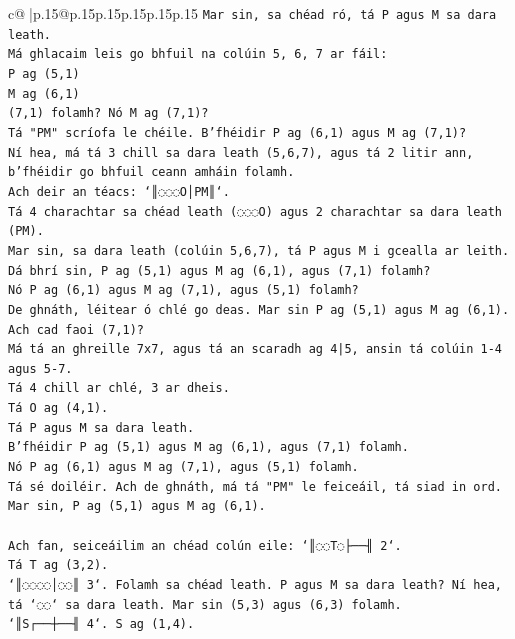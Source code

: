 \documentclass{article}
\begin{document}
{\begin{supertabular}{c@{$\;$}|p{.15\linewidth}@{}p{.15\linewidth}p{.15\linewidth}p{.15\linewidth}p{.15\linewidth}p{.15\linewidth}}
{{{\texttt{Mar sin, sa chéad ró, tá P agus M sa dara leath.} \\
\texttt{Má ghlacaim leis go bhfuil na colúin 5, 6, 7 ar fáil:} \\
\texttt{P ag (5,1)} \\
\texttt{M ag (6,1)} \\
\texttt{(7,1) folamh? Nó M ag (7,1)?} \\
\texttt{Tá "PM" scríofa le chéile. B'fhéidir P ag (6,1) agus M ag (7,1)?} \\
\texttt{Ní hea, má tá 3 chill sa dara leath (5,6,7), agus tá 2 litir ann, b'fhéidir go bhfuil ceann amháin folamh.} \\
\texttt{Ach deir an téacs: `║◌◌◌O│PM║`.} \\
\texttt{Tá 4 charachtar sa chéad leath (◌◌◌O) agus 2 charachtar sa dara leath (PM).} \\
\texttt{Mar sin, sa dara leath (colúin 5,6,7), tá P agus M i gcealla ar leith.} \\
\texttt{Dá bhrí sin, P ag (5,1) agus M ag (6,1), agus (7,1) folamh?} \\
\texttt{Nó P ag (6,1) agus M ag (7,1), agus (5,1) folamh?} \\
\texttt{De ghnáth, léitear ó chlé go deas. Mar sin P ag (5,1) agus M ag (6,1). Ach cad faoi (7,1)?} \\
\texttt{Má tá an ghreille 7x7, agus tá an scaradh ag 4|5, ansin tá colúin 1{-}4 agus 5{-}7.} \\
\texttt{Tá 4 chill ar chlé, 3 ar dheis.} \\
\texttt{Tá O ag (4,1).} \\
\texttt{Tá P agus M sa dara leath.} \\
\texttt{B'fhéidir P ag (5,1) agus M ag (6,1), agus (7,1) folamh.} \\
\texttt{Nó P ag (6,1) agus M ag (7,1), agus (5,1) folamh.} \\
\texttt{Tá sé doiléir. Ach de ghnáth, má tá "PM" le feiceáil, tá siad in ord.} \\
\texttt{Mar sin, P ag (5,1) agus M ag (6,1).} \\
\\ 
\texttt{Ach fan, seiceáilim an chéad colún eile: `║◌◌T◌├──╢ 2`.} \\
\texttt{Tá T ag (3,2).} \\
\texttt{`║◌◌◌◌│◌◌║ 3`. Folamh sa chéad leath. P agus M sa dara leath? Ní hea, tá `◌◌` sa dara leath. Mar sin (5,3) agus (6,3) folamh.} \\
\texttt{`║S┌──┼──╢ 4`. S ag (1,4).} \\
}}}
\end{supertabular}}
\end{document}
